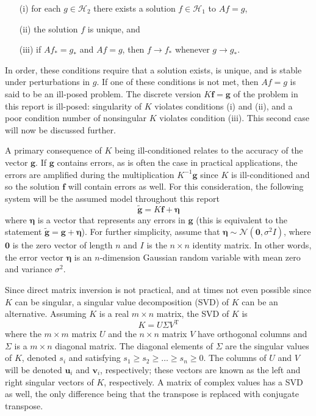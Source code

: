 \documentclass[12pt]{article}
\newcommand{\gdis}{\mathbf{g}}
\newcommand{\gnoise}{\widetilde{\mathbf{g}}}
\newcommand{\kmat}{K}	%
\newcommand{\fdis}{\mathbf{f}}
\newcommand{\trans}{\mathrm{T}}	%
\newcommand{\noiseSD}{\sigma}	%
\newcommand{\noise}{\bm{\eta}}	%
\newcommand{\singular}{s}	%
\newcommand{\LSV}{\mathbf{u}}	%
\newcommand{\RSV}{\mathbf{v}}	%
\begin{document}
\begin{enumerate}
\item[(i)] for each $g \in \mathcal{H}_2$ there exists a solution $f \in \mathcal{H}_1$ to $Af = g$,
\item[(ii)] the solution $f$ is unique, and
\item[(iii)] if $Af_* = g_*$ and $Af = g$, then $f \rightarrow f_*$ whenever $g \rightarrow g_*$.
\end{enumerate}
In order, these conditions require that a solution exists, is unique, and is stable under perturbations in $g$. If one of these conditions is not met, then $Af = g$ is said to be an ill-posed problem. The discrete version $\kmat\fdis = \gdis$ of the problem in this report is ill-posed: singularity of $\kmat$ violates conditions (i) and (ii), and a poor condition number of nonsingular $\kmat$ violates condition (iii). This second case will now be discussed further.  \par 
A primary consequence of $\kmat$ being ill-conditioned relates to the accuracy of the vector $\gdis$. If $\gdis$ contains errors, as is often the case in practical applications, the errors are amplified during the multiplication $\kmat^{-1}\gdis$ since $\kmat$ is ill-conditioned and so the solution $\fdis$ will contain errors as well. For this consideration, the following system will be the assumed model throughout this report
\begin{equation}
\gnoise = \kmat\fdis + \noise
\label{Eq_DisNoise}
\end{equation}
where $\noise$ is a vector that represents any errors in $\gdis$ (this is equivalent to the statement $\gnoise = \gdis + \noise$). For further simplicity, assume that $\noise \sim \mathcal{N}(\bm{0},\noiseSD^2I)$, where $\bm{0}$ is the zero vector of length $n$ and $I$ is the $n \times n$ identity matrix. In other words, the error vector $\noise$ is an $n$-dimension Gaussian random variable with mean zero and variance $\noiseSD^2$. \par
Since direct matrix inversion is not practical, and at times not even possible since $\kmat$ can be singular, a singular value decomposition (SVD) of $\kmat$ can be an alternative. Assuming $\kmat$ is a real $m \times n$ matrix, the SVD of $\kmat$ is
\begin{equation}
\kmat = U\Sigma{V^\trans}
\label{Eq_SVD}
\end{equation}
where the $m \times m$ matrix $U$ and the $n \times n$ matrix $V$ have orthogonal columns and $\Sigma$ is a $m \times n$ diagonal matrix. The diagonal elements of $\Sigma$ are the singular values of $\kmat$, denoted $\singular_i$ and satisfying $\singular_1 \geq \singular_2 \geq \ldots \geq \singular_n \geq 0$. The columns of $U$ and $V$ will be denoted $\LSV_i$ and $\RSV_i$, respectively; these vectors are known as the left and right singular vectors of $\kmat$, respectively. A matrix of complex values has a SVD as well, the only difference being that the transpose is replaced with conjugate transpose. \par
\end{document}
